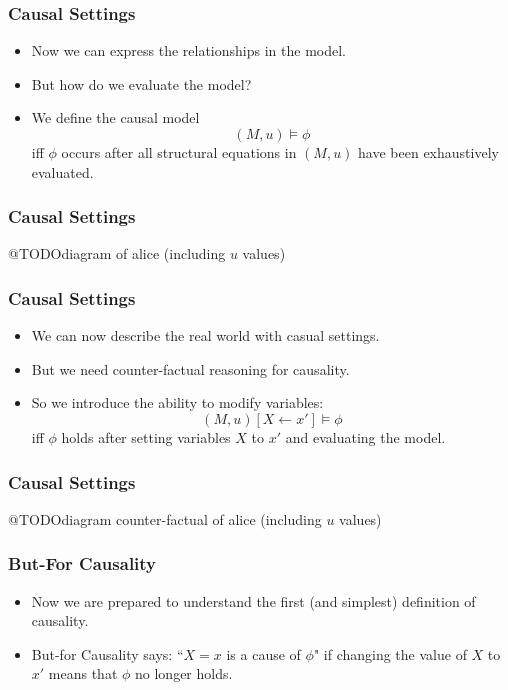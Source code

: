 \documentclass{beamer}
\theoremstyle{plain}
\theoremstyle{definition}
\begin{document}
\begin{frame}
\frametitle{Causal Settings}

\begin{itemize}

\item Now we can express the relationships in the model.
\item But how do we evaluate the model?
\item We define the causal model
\[
(M,u) \models \phi
\] iff $\phi$ occurs after all structural equations in $(M,u)$ have been exhaustively evaluated.

\end{itemize}

\end{frame}


\begin{frame}
\frametitle{Causal Settings}

@TODOdiagram of alice (including $u$ values)

\end{frame}


\begin{frame}
\frametitle{Causal Settings}

\begin{itemize}
\item We can now describe the real world with casual settings.
\item But we need counter-factual reasoning for causality.
\item So we introduce the ability to modify variables:
\[
(M,u) [X \leftarrow x'] \models \phi
\] iff $\phi$ holds after setting variables $X$ to $x'$ and evaluating the model.
\end{itemize}

\end{frame}


\begin{frame}
\frametitle{Causal Settings}

@TODOdiagram counter-factual of alice (including $u$ values)

\end{frame}


\begin{frame}
\frametitle{But-For Causality}
\begin{itemize}
\item Now we are prepared to understand the first (and simplest) definition of causality.
\item But-for Causality says: ``$X=x$ is a cause of $\phi$" if changing the value of $X$ to $x'$ means that $\phi$ no longer holds.
\end{itemize}


\end{frame}
\end{document}
